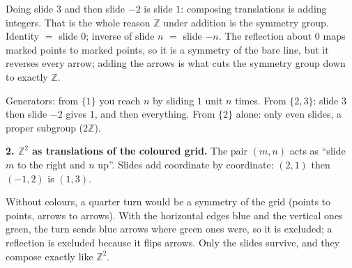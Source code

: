 \documentclass[10pt]{article}
\newcommand{\Z}{\mathbb{Z}}
\begin{document}
{\begin{minipage}[t]{744pt}
\par\vspace{6pt}
\begin{minipage}[t]{360pt}\vspace{0pt}\raggedright
\begin{why}
Doing slide $3$ and then slide $-2$ is slide $1$: composing translations is adding integers. That is the whole reason $\Z$ under addition is the symmetry group. Identity $=$ slide $0$; inverse of slide $n$ $=$ slide $-n$. The reflection about $0$ maps marked points to marked points, so it is a symmetry of the bare line, but it reverses every arrow; adding the arrows is what cuts the symmetry group down to exactly $\Z$.
\end{why}
\begin{tryit}
Generators: from $\{1\}$ you reach $n$ by sliding $1$ unit $n$ times. From $\{2,3\}$: slide $3$ then slide $-2$ gives $1$, and then everything. From $\{2\}$ alone: only even slides, a proper subgroup ($2\Z$).
\end{tryit}
\end{minipage}\hfill
\begin{minipage}[t]{360pt}\vspace{0pt}\raggedright
{\sffamily\bfseries 2. $\Z^2$ as translations of the coloured grid.} The pair $(m,n)$ acts as ``slide $m$ to the right and $n$ up''. Slides add coordinate by coordinate: $(2,1)$ then $(-1,2)$ is $(1,3)$.
\begin{pitfall}
Without colours, a quarter turn would be a symmetry of the grid (points to points, arrows to arrows). With the horizontal edges blue and the vertical ones green, the turn sends blue arrows where green ones were, so it is excluded; a reflection is excluded because it flips arrows. Only the slides survive, and they compose exactly like $\Z^2$.

\end{pitfall}
\end{minipage}
\end{minipage}}
\end{document}
